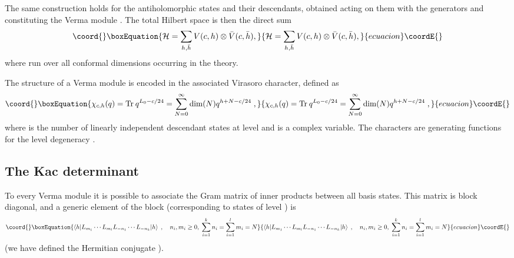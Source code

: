 \documentclass[a4paper,12pt]{report}
\begin{document}
The same construction holds for the antiholomorphic states \coordHE{} and
their descendants, obtained acting on them with the generators \coordHE{} and constituting the Verma module
\coordHE{}. The total Hilbert space is then the direct sum
\begin{equation}\coord{}\boxEquation{\label{hilbert}
{\cal H}=\sum_{h,\bar{h}}V(c,h)\otimes \bar{V}(c,\bar{h}),
}{{\cal H}=\sum_{h,\bar{h}}V(c,h)\otimes \bar{V}(c,\bar{h}),
}{ecuacion}\coordE{}\end{equation}
where \coordHE{} run over all conformal dimensions occurring in the theory.

The structure of a Verma module is encoded in the associated Virasoro character, defined as
\begin{equation}\coord{}\boxEquation{\label{char}
\chi _{c,h }(q)=\textrm{Tr}\:q^{L_{0}-c/24}=\sum_{N =0}^{\infty }\dim (N )q^{h +N -c/24}\;,
}{\chi _{c,h }(q)=\textrm{Tr}\:q^{L_{0}-c/24}=\sum_{N =0}^{\infty }\dim (N )q^{h +N -c/24}\;,
}{ecuacion}\coordE{}\end{equation}
where \coordHE{} is the number of linearly independent descendant states at level \coordHE{} and \coordHE{} is a complex
variable. The characters are generating functions for the level degeneracy \coordHE{}.


\subsection{The Kac determinant}

To every Verma module it is possible to associate the Gram matrix \coordHE{} of inner products between all basis
states. This matrix is block diagonal, and a generic element of the block \coordHE{} (corresponding to states
of level \coordHE{}) is
\begin{equation}\coord{}\boxEquation{
\left\langle h |L_{m_{1}}\cdots L_{m_{l}}L_{-n_{1}}\cdots L_{-n_{k}}|h \right\rangle \;,\quad n_{i},m_{i}\geq
0,\;\sum_{i=1}^{k}n_{i}=\sum_{i=1}^{l}m_{i}=N
}{
\left\langle h |L_{m_{1}}\cdots L_{m_{l}}L_{-n_{1}}\cdots L_{-n_{k}}|h \right\rangle \;,\quad n_{i},m_{i}\geq
0,\;\sum_{i=1}^{k}n_{i}=\sum_{i=1}^{l}m_{i}=N
}{ecuacion}\coordE{}\end{equation}
(we have defined the Hermitian conjugate \coordHE{}).
\end{document}
